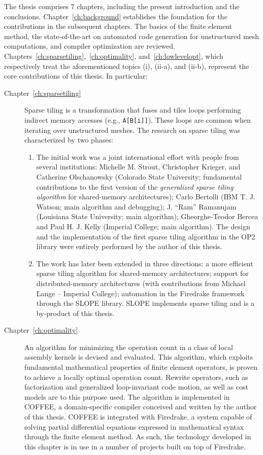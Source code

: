 The thesis comprises 7 chapters, including the present introduction and the conclusions. Chapter~\ref{ch:background} establishes the foundation for the contributions in the subsequent chapters. The basics of the finite element method, the state-of-the-art on automated code generation for unstructured mesh computations, and compiler optimization are reviewed. Chapters~\ref{ch:sparsetiling},~\ref{ch:optimality}, and~\ref{ch:lowlevelopt}, which respectively treat the aforementioned topics (i), (ii-a), and (ii-b), represent the core contributions of this thesis. In particular:

\begin{description}
\item[Chapter~\ref{ch:sparsetiling}] Sparse tiling is a transformation that fuses and tiles loops performing indirect memory accesses (e.g., {\tt A[B[i]]}). These loops are common when iterating over unstructured meshes. The research on sparse tiling was characterized by two phases:
\begin{enumerate}
\item The initial work was a joint international effort with people from several institutions: Michelle M. Strout, Christopher Krieger, and Catherine Olschanowsky (Colorado State University; fundamental contributions to the first version of the {\em generalized sparse tiling algorithm} for shared-memory architectures); Carlo Bertolli (IBM T. J. Watson; main algorithm and debugging); J. ``Ram'' Ramanujam (Louisiana State University; main algorithm); Gheorghe-Teodor Bercea and Paul H. J. Kelly (Imperial College; main algorithm). The design and the implementation of the first sparse tiling algorithm in the OP2 library were entirely performed by the author of this thesis. 
\item The work has later been extended in three directions: a more efficient sparse tiling algorithm for shared-memory architectures; support for distributed-memory architectures (with contributions from Michael Lange -- Imperial College); automation in the Firedrake framework through the SLOPE library. SLOPE implements sparse tiling and is a by-product of this thesis.
\end{enumerate}

\item[Chapter~\ref{ch:optimality}] An algorithm for minimizing the operation count in a class of local assembly kernels is devised and evaluated. This algorithm, which exploits fundamental mathematical properties of finite element operators, is proven to achieve a locally optimal operation count. Rewrite operators, such as factorization and generalized loop-invariant code motion, as well as cost models are to this purpose used. The algorithm is implemented in COFFEE, a domain-specific compiler conceived and written by the author of this thesis. COFFEE is integrated with Firedrake, a system capable of solving partial differential equations expressed in mathematical syntax through the finite element method. As such, the technology developed in this chapter is in use in a number of projects built on top of Firedrake.


\end{description}
